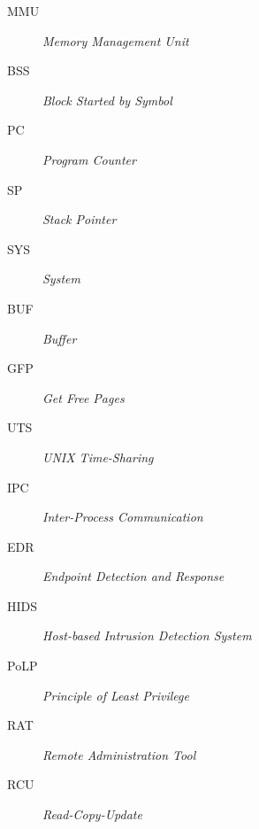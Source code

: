 \begin{description}
	\item[MMU] \emph{Memory Management Unit}
	\item[BSS] \emph{Block Started by Symbol}
	\item[PC] \emph{Program Counter}
    \item[SP] \emph{Stack Pointer}
	\item[SYS] \emph{System}
	\item[BUF] \emph{Buffer}
	\item[GFP] \emph{Get Free Pages}
    \item[UTS] \emph{UNIX Time-Sharing}
    \item[IPC] \emph{Inter-Process Communication}
    \item[EDR] \emph{Endpoint Detection and Response}
    \item[HIDS] \emph{Host-based Intrusion Detection System}
    \item[PoLP] \emph{Principle of Least Privilege}
    \item[RAT] \emph{Remote Administration Tool}
    \item[RCU] \emph{Read-Copy-Update}
\end{description}
